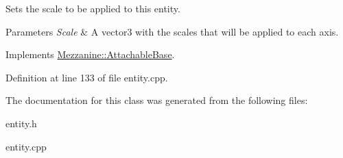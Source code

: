 Sets the scale to be applied to this entity. 


\begin{DoxyParams}{Parameters}
{\em Scale} & A vector3 with the scales that will be applied to each axis. \\
\hline
\end{DoxyParams}


Implements \hyperlink{classMezzanine_1_1AttachableBase_a5201923c0685e592dee8cecabc72b508}{Mezzanine::AttachableBase}.



Definition at line 133 of file entity.cpp.



The documentation for this class was generated from the following files:\begin{DoxyCompactItemize}
\item 
entity.h\item 
entity.cpp\end{DoxyCompactItemize}
